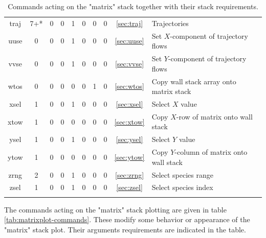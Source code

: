 \documentclass[a4paper,10pt]{report}
\begin{document}
\begin{center}
\begin{longtable}{|c|c|c|c|c|c|c|c|c|l|}
    traj \index{b2plot, traj}      & 7+* & 0 & 0 & 1 & 0 & 0 & 0 & \ref{sec:traj}  & Trajectories \\
    uuse \index{b2plot, uuse}      & 0 & 0 & 0 & 1 & 0 & 0 & 0 & \ref{sec:uuse}  & Set $X$-component of trajectory flows \\
    vvse \index{b2plot, vvse}      & 0 & 0 & 0 & 1 & 0 & 0 & 0 & \ref{sec:vvse}  & Set $Y$-component of trajectory flows \\
    wtos \index{b2plot, wtos}      & 0 & 0 & 0 & 0 & 0 & 1 & 0 & \ref{sec:wtos}  & Copy wall stack array onto matrix stack \\
    xsel \index{b2plot, xsel}      & 1 & 0 & 0 & 1 & 0 & 0 & 0 & \ref{sec:xsel}  & Select $X$ value \\
    xtow \index{b2plot, xtow}      & 1 & 0 & 0 & 0 & 0 & 0 & 0 & \ref{sec:xtow}  & Copy $X$-row of matrix onto wall stack \\
    ysel \index{b2plot, ysel}      & 1 & 0 & 0 & 1 & 0 & 0 & 0 & \ref{sec:ysel}  & Select $Y$ value \\
    ytow \index{b2plot, ytow}      & 1 & 0 & 0 & 0 & 0 & 0 & 0 & \ref{sec:ytow}  & Copy $Y$-column of matrix onto wall stack \\
    zrng \index{b2plot, zrng}      & 2 & 0 & 0 & 1 & 0 & 0 & 0 & \ref{sec:zrng}  & Select species range \\
    zsel \index{b2plot, zsel}      & 1 & 0 & 0 & 1 & 0 & 0 & 0 & \ref{sec:zsel}  & Select species index \\
    \hline
    \caption{Commands acting on the "matrix" stack together with their stack requirements.}
    \label{tab:available-commands}
  \end{longtable}
\end{center}

The commands acting on the "matrix" stack plotting are given in table
\ref{tab:matrixplot-commands}.  These modify some behavior or
appearance of the "matrix" stack plot.  Their arguments requirements
are indicated in the table.
\end{document}
